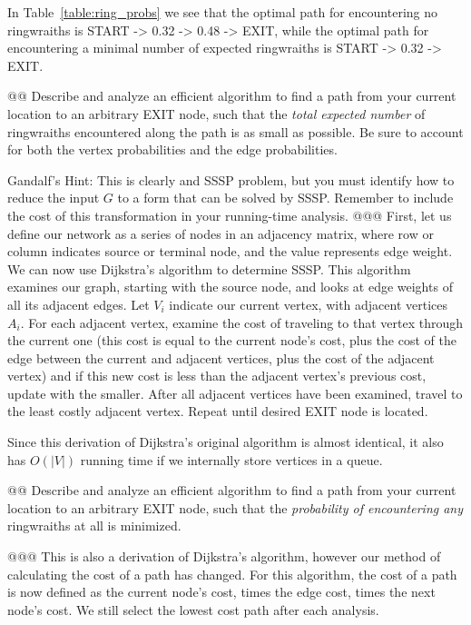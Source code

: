 \documentclass[10pt]{article}\usepackage[]{graphicx}\usepackage[]{xcolor}
\begin{document}
\begin{easylist}[enumerate]
    In Table~\ref{table:ring_probs} we see that the optimal path for encountering no ringwraiths is {\ttfamily START ->
    0.32 -> 0.48 -> EXIT}, while the optimal path for encountering a minimal number of expected ringwraiths is {\ttfamily START
    -> 0.32 -> EXIT}.

    @@ Describe and analyze an efficient algorithm to find a path from your current location to an arbitrary EXIT node,
    such that the \textit{total expected number} of ringwraiths encountered along the path is as small as possible. Be
    sure to account for both the vertex probabilities and the edge probabilities.

    Gandalf's Hint: This is clearly and SSSP problem, but you must identify how to reduce the input $G$ to a form that
    can be solved by SSSP. Remember to include the cost of this transformation in your running-time analysis.
    @@@ First, let us define our network as a series of nodes in an adjacency matrix, where row or column indicates
    source or terminal node, and the value represents edge weight. We can now use Dijkstra's algorithm to determine
    SSSP. This algorithm examines our graph, starting with the source node, and looks at edge weights of all its
    adjacent edges. Let $V_i$ indicate our current vertex, with adjacent vertices $A_i$. For each adjacent vertex,
    examine the cost of traveling to that vertex through the current one (this cost is equal to the current node's cost,
    plus the cost of the edge between the current and adjacent vertices, plus the cost of the adjacent vertex) and if
    this new cost is less than the adjacent vertex's previous cost, update with the smaller. After all adjacent vertices
    have been examined, travel to the least costly adjacent vertex. Repeat until desired EXIT node is located.\newline

    Since this derivation of Dijkstra's original algorithm is almost identical, it also has $O(|V|)$ running time if we
    internally store vertices in a queue.

    @@ Describe and analyze an efficient algorithm to find a path from your current location to an arbitrary EXIT node,
    such that the \textit{probability of encountering any} ringwraiths at all is minimized.

    @@@ This is also a derivation of Dijkstra's algorithm, however our method of calculating the cost of a path has
    changed. For this algorithm, the cost of a path is now defined as the current node's cost, times the edge cost,
    times the next node's cost. We still select the lowest cost path after each analysis.\newline


\end{easylist}
\end{document}
